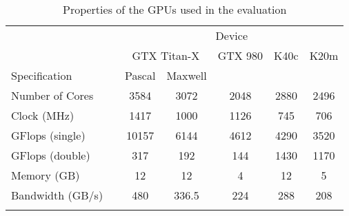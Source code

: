 \begin{table}[tb]	%
%
%
%
\setlength\tabcolsep{0.4em}
\center\begin{tabular}{lc c c c c c}
                         && \multicolumn{5}{c}{Device} \\
\cline{3-7}
              && \multicolumn{2}{c}{GTX Titan-X} & GTX 980 & K40c  & K20m  \\
Specification            && Pascal & Maxwell     &         &       &       \\
\cline{1-1}\cline{3-7}
Number of Cores          && 3584   & 3072        & 2048    & 2880  & 2496  \\
Clock (MHz)              && 1417   & 1000        & 1126    & 745   & 706   \\
GFlops (single)          && 10157  & 6144        & 4612    & 4290  & 3520  \\
GFlops (double)          && 317    & 192         & 144     & 1430  & 1170  \\
Memory (GB)              && 12     & 12          & 4       & 12    & 5     \\
Bandwidth (GB/s)         && 480    & 336.5       & 224     & 288   & 208   \\
\cline{1-1}\cline{3-7}
\\[-1.5ex]
\end{tabular}
\caption{Properties of the GPUs used in the evaluation}
\label{table-gpus}
\end{table}

